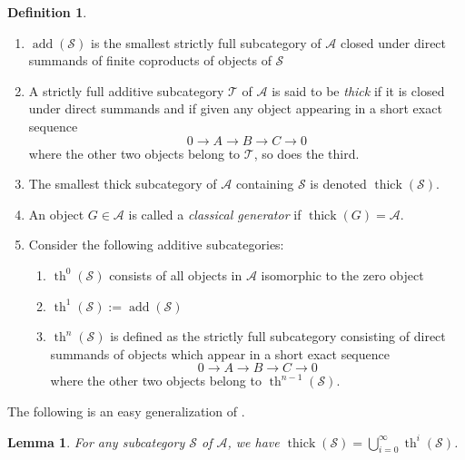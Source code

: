 \documentclass[11pt]{amsart}
\theoremstyle{plain}
\newtheorem{lemma}[theorem]{Lemma}
\theoremstyle{definition}
\newtheorem{definition}[theorem]{Definition}
\numberwithin{equation}{section}
\numberwithin{theorem}{section}
\begin{document}
\begin{definition}
    \hfill
    \begin{enumerate}
        \item $\operatorname{add}(\mathcal{S})$ is the smallest strictly full subcategory of $\mathcal{A}$ closed under direct summands of finite coproducts of objects of $\mathcal{S}$
        \item A strictly full additive subcategory $\mathcal{T}$ of $\mathcal{A}$ is said to be \textit{thick} if it is closed under direct summands and if given any object appearing in a short exact sequence
        \begin{displaymath}
            0 \to A \to B \to C \to 0
        \end{displaymath} 
        where the other two objects belong to $\mathcal{T}$, so does the third.
        \item The smallest thick subcategory of $\mathcal{A}$ containing $\mathcal{S}$ is denoted $\operatorname{thick}(\mathcal{S})$.
        \item An object $G\in \mathcal{A}$ is called a \textit{classical generator} if $\operatorname{thick}(G)=\mathcal{A}$.
        \item Consider the following additive subcategories:
        \begin{enumerate}
            \item $\operatorname{th}^0 (\mathcal{S})$ consists of all objects in $\mathcal{A}$ isomorphic to the zero object
            \item $\operatorname{th}^1 (\mathcal{S}):= \operatorname{add}(\mathcal{S})$
            \item $\operatorname{th}^n (\mathcal{S})$ is defined as the strictly full subcategory consisting of direct summands of objects which appear in a short exact sequence
            \begin{displaymath}
                0 \to A \to B \to C \to 0
            \end{displaymath}
            where the other two objects belong to $\operatorname{th}^{n-1}(\mathcal{S})$.
        \end{enumerate}
    \end{enumerate}
\end{definition}

The following is an easy generalization of \cite[Lemma 3.15]{Dey/Lank/Takahashi:2023}.

\begin{lemma}\label{lem:thick_abelian_filtration}
    For any subcategory $\mathcal{S}$ of $\mathcal{A}$, we have $\operatorname{thick}(\mathcal{S})= \bigcup^\infty_{i=0} \operatorname{th}^i (\mathcal{S})$.
\end{lemma}
\end{document}
